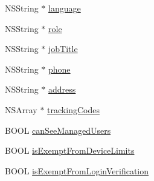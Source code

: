 \begin{DoxyCompactItemize}
\item 
N\-S\-String $\ast$ \hyperlink{category_m_b_user_07_08_a21232543498af2a825f7cc68e1b13870}{language}
\item 
N\-S\-String $\ast$ \hyperlink{category_m_b_user_07_08_a51575ddbd2b177ec3462a7b48d4f5059}{role}
\item 
N\-S\-String $\ast$ \hyperlink{category_m_b_user_07_08_a83c48f901d8e998e2a5bf9989963cb2c}{job\-Title}
\item 
N\-S\-String $\ast$ \hyperlink{category_m_b_user_07_08_a898dc377fa828bb1a4e94ad8f1acb101}{phone}
\item 
N\-S\-String $\ast$ \hyperlink{category_m_b_user_07_08_a90b69a40ac9494c24ef220d2564afc0d}{address}
\item 
N\-S\-Array $\ast$ \hyperlink{category_m_b_user_07_08_ad9df8718131f2681768bf851afb43963}{tracking\-Codes}
\item 
B\-O\-O\-L \hyperlink{category_m_b_user_07_08_aa9d85e54ce8ba89ab2ce480d31821553}{can\-See\-Managed\-Users}
\item 
B\-O\-O\-L \hyperlink{category_m_b_user_07_08_a2596dea4aeaeb87b1d3d872c54e63f1a}{is\-Exempt\-From\-Device\-Limits}
\item 
B\-O\-O\-L \hyperlink{category_m_b_user_07_08_a13cc5f0142bb943e1d08798f8510b265}{is\-Exempt\-From\-Login\-Verification}
\end{DoxyCompactItemize}


